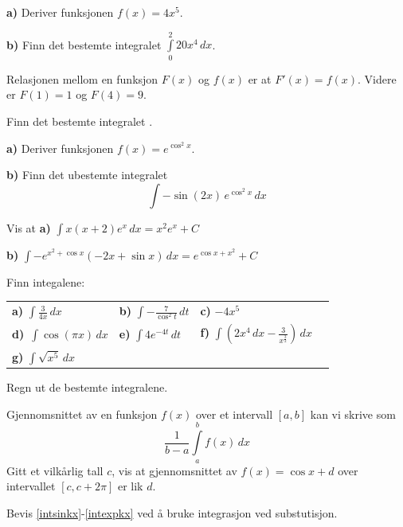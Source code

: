 




	
	
\opgt

\textbf{a)} Deriver funksjonen $ f(x)=4x^5 $.\os

\textbf{b)} Finn det bestemte integralet $ \int\limits_0^2 20 x^4 \, dx $.

Relasjonen mellom en funksjon $ F(x) $ og $f(x) $ er at $ F'(x)=f(x) $. Videre er $ F(1)=1 $ og $ F(4)=9 $.\os

Finn det bestemte integralet .

\textbf{a)} Deriver funksjonen $ f(x)=e^{\cos^2 x} $.\os

\textbf{b)} Finn det ubestemte integralet \[ \int -\sin (2x)\, e^{\cos^2 x}\,dx \]\vs\vs

Vis at\os
\textbf{a)} $\displaystyle \int x(x+2)e^x \,dx = x^2 e^x + C $ \os

\textbf{b)} $\displaystyle \int -e^{x^2+\cos x} (-2 x+\sin x)\,dx= e^{\cos x+x^2}+C  $

\nes

Finn integalene:\os
\begin{tabular}{@{}l l l l}	
\textbf{a)} $ \displaystyle \int \frac{3}{4 x} \,dx$ &\quad \textbf{b)} $ \displaystyle \int-\frac{7}{\cos^2 t}\,dt $ &\quad \textbf{c)} $ -4x^5 $ \\[20 pt]
\textbf{d)}\ $\displaystyle \int \cos(\pi x) \,dx$ & \quad
\textbf{e)} $\displaystyle \int 4e^{-4t} \,dt$ &\quad\textbf{f)} $ \displaystyle \int \left(2x^4\,dx - \frac{3}{x^{\frac{3}{2}}}\right) \,dx$ \\[20pt]
\textbf{g)} $\displaystyle \int \sqrt{x^5}\,dx $
\end{tabular} 
\newpage
{}
Regn ut de bestemte integralene.\os
{}

Gjennomsnittet av en funksjon $ f(x) $ over et intervall $ [a, b] $ kan vi skrive som
\[ \frac{1}{b-a}\int\limits_a^b f(x)\,dx \]
Gitt et vilkårlig tall $ c $, vis at gjennomsnittet av $f(x)=\cos x+d  $ over intervallet $ [c, c+2\pi] $ er lik $ d $. 

Bevis \eqref{intsinkx}-\eqref{intexpkx} ved å bruke integrasjon ved substutisjon.


